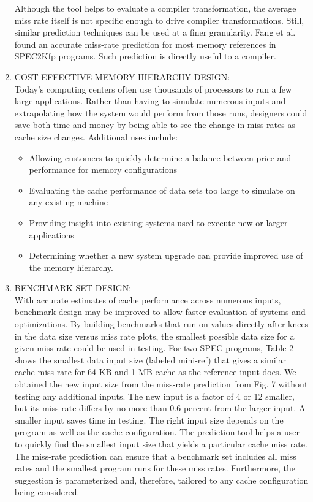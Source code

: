 \documentclass[14pt]{article}
\begin{document}
\begin{enumerate}
Although the tool helps to evaluate a compiler transformation, the average miss rate itself is not specific enough to drive compiler transformations. Still, similar prediction techniques can be used at a finer granularity. Fang et al. found an accurate miss-rate prediction for most memory references in SPEC2Kfp programs. Such prediction is directly useful to a compiler.
\item COST EFFECTIVE MEMORY HIERARCHY DESIGN:\\
Today’s computing centers often use thousands of processors to run a few large applications. Rather than having to simulate numerous inputs and extrapolating how the system would perform from those runs, designers could save both time and money by being able to see the change in miss rates as cache size changes. Additional uses include: 
\begin{itemize}
\item Allowing customers to quickly determine a balance between price and performance for memory configurations
\item Evaluating the cache performance of data sets too large to simulate on any existing machine
\item Providing insight into existing systems used to execute new or larger applications 
\item Determining whether a new system upgrade can provide improved use of the memory hierarchy.
\end{itemize} 
\item BENCHMARK SET DESIGN:\\
With accurate estimates of cache performance across numerous inputs, benchmark design may be improved to allow faster evaluation of systems and optimizations. By building benchmarks that run on values directly after knees in the data size versus miss rate plots, the smallest possible data size for a given miss rate could be used in testing. For two SPEC programs, Table 2 shows the smallest data input size (labeled mini-ref) that gives a similar cache miss rate for 64 KB and 1 MB cache as the reference input does. We obtained the new input size from the miss-rate prediction from Fig. 7 without testing any additional inputs. The new input is a factor of 4 or 12 smaller, but its miss rate differs by no more than 0.6 percent from the larger input. A smaller input saves time in testing. The right input size depends on the program as well as the cache configuration. The prediction tool helps a user to quickly find the smallest input size that yields a particular cache miss rate. The miss-rate prediction can ensure that a benchmark set includes all miss rates and the smallest program runs for these miss rates. Furthermore, the suggestion is parameterized and, therefore, tailored to any cache configuration being considered.

\end{enumerate}
\end{document}
